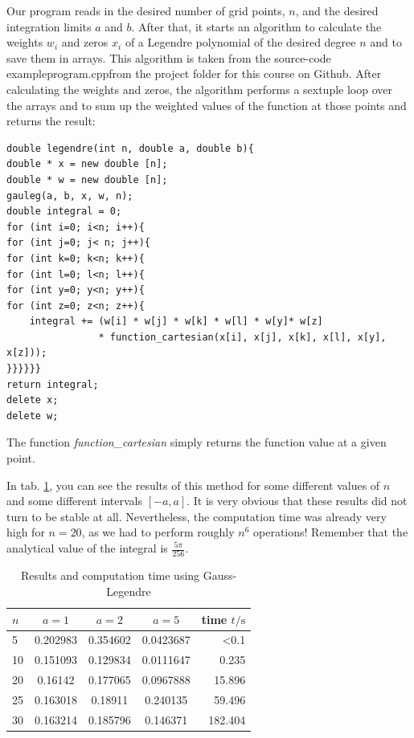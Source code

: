 \documentclass[10pt,a4paper]{article}
\begin{document}
Our program reads in the desired number of grid points, $n$, and the desired integration limits $a$ and $b$. After that, it starts an algorithm to calculate the weights $w_i$ and zeros $x_i$ of a Legendre polynomial of the desired degree $n$ and to save them in arrays. This algorithm is taken from the source-code \glqq exampleprogram.cpp\grqq from the project folder for this course on Github. After calculating the weights and zeros, the algorithm performs a sextuple loop over the arrays and to sum up the weighted values of the function at those points and returns the result:
\begin{lstlisting}
double legendre(int n, double a, double b){
double * x = new double [n];
double * w = new double [n];
gauleg(a, b, x, w, n);
double integral = 0;
for (int i=0; i<n; i++){
for (int j=0; j< n; j++){
for (int k=0; k<n; k++){
for (int l=0; l<n; l++){
for (int y=0; y<n; y++){
for (int z=0; z<n; z++){
	integral += (w[i] * w[j] * w[k] * w[l] * w[y]* w[z]
				* function_cartesian(x[i], x[j], x[k], x[l], x[y], x[z]));
}}}}}}
return integral;
delete x;
delete w;
\end{lstlisting}
The function \emph{function\_cartesian} simply returns the function value at a given point.

In tab. \ref{results_leg}, you can see the results of this method for some different values of $n$ and some different intervals $[-a,a]$. It is very obvious that these results did not turn to be stable at all. Nevertheless, the computation time was already very high for $n=20$, as we had to perform roughly $n^6$ operations! Remember that the analytical value of the integral is $\frac{5\pi}{256}$.
\begin{table}[h]
	\caption{Results and computation time using Gauss-Legendre\label{results_leg}}
	\centering
\begin{tabular}{lcccr}
	$n$	&	$a=1$	&	$a=2$	&	$a=5$	&	time $t/\mathrm{s}$	\\\hline
	5	&	0.202983	&	0.354602	&	0.0423687	&	<0.1	\\
	10	&	0.151093	&	0.129834	&	0.0111647	&	0.235	\\
	20	&	0.16142	&	0.177065	&	0.0967888	&	15.896	\\
	25	&	0.163018	&	0.18911	&	0.240135	&	59.496	\\
	30	&	0.163214	&	0.185796	&	0.146371	&	182.404		
\end{tabular}
\end{table}
\end{document}
